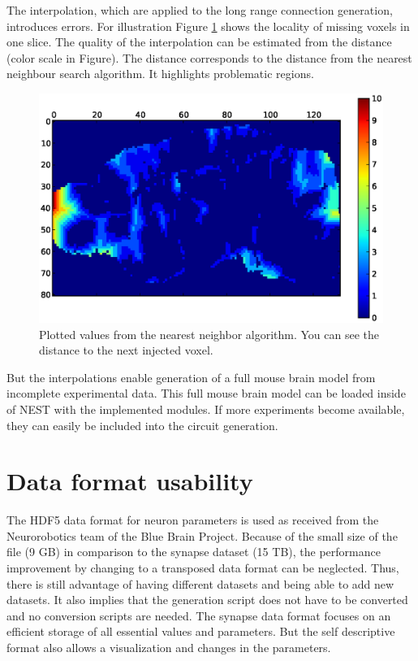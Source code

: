 The interpolation, which are applied to the long range connection generation, introduces errors.
For illustration Figure \ref{interpolationdistance} shows the locality of missing voxels in one slice.
The quality of the interpolation can be estimated from the distance (color scale in Figure).
The distance corresponds to the distance from the nearest neighbour search algorithm.
It highlights problematic regions.
\begin{figure}[ht!]
\centering
\includegraphics[scale=0.5]{pictures/distance_x_y_70.eps}
\caption{Plotted values from the nearest neighbor algorithm. You can see the distance to the next injected voxel.}
\label{interpolationdistance}
\end{figure}
But the interpolations enable generation of a full mouse brain model from incomplete experimental data.
This full mouse brain model can be loaded inside of NEST with the implemented modules.
If more experiments become available, they can easily be included into
the circuit generation.



\section{Data format usability}
The HDF5 data format for neuron parameters is used as received from the Neurorobotics team of the Blue Brain Project.
Because of the small size of the file (9 GB) in comparison to the synapse dataset (15 TB), the performance improvement by changing
to a transposed data format can be neglected. Thus, there is still advantage of having different datasets and being able
to add new datasets. It also implies that the generation script does not have to be converted and no 
conversion scripts are needed. The synapse data format focuses on an efficient storage of all essential values and parameters.
But the self descriptive format also allows a visualization and changes in the parameters.


